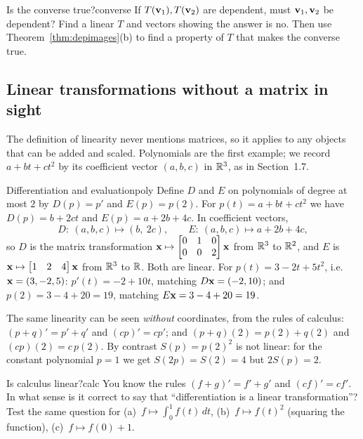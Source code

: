 \documentclass[11pt]{article}
\begin{document}
\begin{think}{Is the converse true?}{converse}
If $T(\mathbf{v}_1),T(\mathbf{v}_2)$ are dependent, must $\mathbf{v}_1,\mathbf{v}_2$ be dependent? Find a linear $T$ and vectors showing the answer is no. Then use Theorem~\ref{thm:depimages}(b) to find a property of $T$ that makes the converse true.
\end{think}

\subsection*{Linear transformations without a matrix in sight}

The definition of linearity never mentions matrices, so it applies to any objects that can be added and scaled. Polynomials are the first example; we record $a+bt+ct^2$ by its coefficient vector $(a,b,c)$ in $\mathbb{R}^3$, as in Section~1.7.

\begin{exmp}{Differentiation and evaluation}{poly}
Define $D$ and $E$ on polynomials of degree at most $2$ by $D(p)=p'$ and $E(p)=p(2)$. For $p(t)=a+bt+ct^2$ we have $D(p)=b+2ct$ and $E(p)=a+2b+4c$. In coefficient vectors,
\[
D:\ (a,b,c)\mapsto(b,\ 2c),\qquad E:\ (a,b,c)\mapsto a+2b+4c,
\]
so $D$ is the matrix transformation $\mathbf{x}\mapsto\begin{bmatrix}0&1&0\\0&0&2\end{bmatrix}\mathbf{x}$ from $\mathbb{R}^3$ to $\mathbb{R}^2$, and $E$ is $\mathbf{x}\mapsto\begin{bmatrix}1&2&4\end{bmatrix}\mathbf{x}$ from $\mathbb{R}^3$ to $\mathbb{R}$. Both are linear. For $p(t)=3-2t+5t^2$, i.e.\ $\mathbf{x}=(3,-2,5)$: $p'(t)=-2+10t$, matching $D\mathbf{x}=(-2,10)$; and $p(2)=3-4+20=19$, matching $E\mathbf{x}=3-4+20=19$.

The same linearity can be seen \emph{without} coordinates, from the rules of calculus: $(p+q)'=p'+q'$ and $(cp)'=cp'$; and $(p+q)(2)=p(2)+q(2)$ and $(cp)(2)=c\,p(2)$. By contrast $S(p)=p(2)^2$ is not linear: for the constant polynomial $p=1$ we get $S(2p)=S(2)=4$ but $2S(p)=2$.
\end{exmp}

\begin{think}{Is calculus linear?}{calc}
You know the rules $(f+g)'=f'+g'$ and $(cf)'=cf'$. In what sense is it correct to say that ``differentiation is a linear transformation''? Test the same question for (a)~$f\mapsto\int_0^1 f(t)\,dt$, (b)~$f\mapsto f(t)^2$ (squaring the function), (c)~$f\mapsto f(0)+1$.
\end{think}
\end{document}

